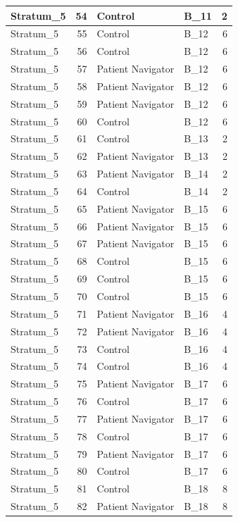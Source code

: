 \documentclass[
]{book}
\begin{document}
\begin{table}[H]
\begin{tabular}{l|r|l|l|r}
\hline
Stratum\_5 & 54 & Control & B\_11 & 2\\
\hline
Stratum\_5 & 55 & Control & B\_12 & 6\\
\hline
Stratum\_5 & 56 & Control & B\_12 & 6\\
\hline
Stratum\_5 & 57 & Patient Navigator & B\_12 & 6\\
\hline
Stratum\_5 & 58 & Patient Navigator & B\_12 & 6\\
\hline
Stratum\_5 & 59 & Patient Navigator & B\_12 & 6\\
\hline
Stratum\_5 & 60 & Control & B\_12 & 6\\
\hline
Stratum\_5 & 61 & Control & B\_13 & 2\\
\hline
Stratum\_5 & 62 & Patient Navigator & B\_13 & 2\\
\hline
Stratum\_5 & 63 & Patient Navigator & B\_14 & 2\\
\hline
Stratum\_5 & 64 & Control & B\_14 & 2\\
\hline
Stratum\_5 & 65 & Patient Navigator & B\_15 & 6\\
\hline
Stratum\_5 & 66 & Patient Navigator & B\_15 & 6\\
\hline
Stratum\_5 & 67 & Patient Navigator & B\_15 & 6\\
\hline
Stratum\_5 & 68 & Control & B\_15 & 6\\
\hline
Stratum\_5 & 69 & Control & B\_15 & 6\\
\hline
Stratum\_5 & 70 & Control & B\_15 & 6\\
\hline
Stratum\_5 & 71 & Patient Navigator & B\_16 & 4\\
\hline
Stratum\_5 & 72 & Patient Navigator & B\_16 & 4\\
\hline
Stratum\_5 & 73 & Control & B\_16 & 4\\
\hline
Stratum\_5 & 74 & Control & B\_16 & 4\\
\hline
Stratum\_5 & 75 & Patient Navigator & B\_17 & 6\\
\hline
Stratum\_5 & 76 & Control & B\_17 & 6\\
\hline
Stratum\_5 & 77 & Patient Navigator & B\_17 & 6\\
\hline
Stratum\_5 & 78 & Control & B\_17 & 6\\
\hline
Stratum\_5 & 79 & Patient Navigator & B\_17 & 6\\
\hline
Stratum\_5 & 80 & Control & B\_17 & 6\\
\hline
Stratum\_5 & 81 & Control & B\_18 & 8\\
\hline
Stratum\_5 & 82 & Patient Navigator & B\_18 & 8\\

\end{tabular}
\end{table}
\end{document}
